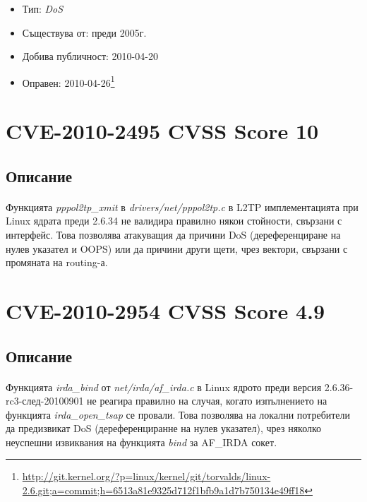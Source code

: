 \documentclass[a4paper,12pt,leqno]{article}
\begin{document}
\begin{itemize}
    \item Тип: \textit{DoS}
    \item Съществува от: преди 2005г.
  	\item Добива публичност: 2010-04-20
    \item Оправен: 2010-04-26\footnote{\url{http://git.kernel.org/?p=linux/kernel/git/torvalds/linux-2.6.git;a=commit;h=6513a81e9325d712f1bfb9a1d7b750134e49ff18}}
\end{itemize}


\section{CVE-2010-2495 CVSS Score 10}
\subsection{Описание}
\paragraph{}
Функцията \textit{pppol2tp\_xmit} в \textit{drivers/net/pppol2tp.c} в L2TP имплементацията при Linux ядрата преди 2.6.34 не валидира правилно някои стойности, свързани с интерфейс. Това позволява атакуващия да причини DoS (дереференциране на нулев указател и OOPS) или да причини други щети, чрез вектори, свързани с промяната на routing-а.



\section{CVE-2010-2954 CVSS Score 4.9}
\subsection{Описание}
\paragraph{}
Функцията \textit{irda\_bind} от \textit{net/irda/af\_irda.c} в Linux ядрото преди версия 2.6.36-rc3-след-20100901 не реагира правилно на случая, когато изпълнението на функцията \textit{irda\_open\_tsap} се провали. Това позволява на локални потребители да предизвикат DoS (дереференциранне на нулев указател), чрез няколко неуспешни извиквания на функцията \textit{bind} за AF\_IRDA сокет.
\end{document}
